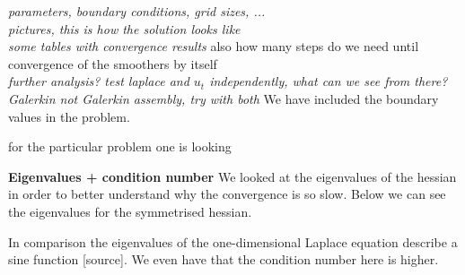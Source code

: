 \documentclass[../draft_1.tex]{subfiles}
\begin{document}
\textit{parameters, boundary conditions, grid sizes, ...}
\bigskip
\\
\textit{pictures, this is how the solution looks like}
\bigskip
\\
\textit{some tables with convergence results}
also how many steps do we need until convergence of the smoothers by itself
\bigskip
\\
\textit{further analysis? test laplace and $u_t$ independently, what can we see from there?}
\\
\textit{Galerkin not Galerkin assembly, try with both}
We have included the boundary values in the problem. 

 for the particular problem one is looking 

\textbf{Eigenvalues + condition number}
We looked at the eigenvalues of the hessian in order to better understand why the convergence is so slow. Below we can see the eigenvalues for the symmetrised hessian. 

In comparison the eigenvalues of the one-dimensional Laplace equation describe a sine function [source]. We even have that the condition number here is higher. 
\end{document}
